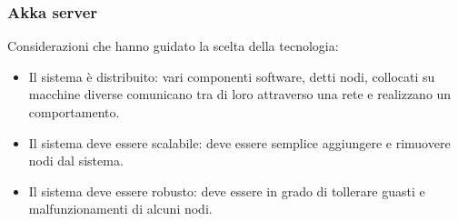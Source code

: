 \subsubsection{Akka server}



Considerazioni che hanno guidato la scelta della tecnologia:
\begin{itemize}
    \item Il sistema è distribuito: vari componenti software, detti nodi, collocati su macchine diverse comunicano tra di loro attraverso una rete e realizzano un comportamento.
    \item Il sistema deve essere scalabile: deve essere semplice aggiungere e rimuovere nodi dal sistema.
    \item Il sistema deve essere robusto: deve essere in grado di tollerare guasti e malfunzionamenti di alcuni nodi.
\end{itemize}







\newpage